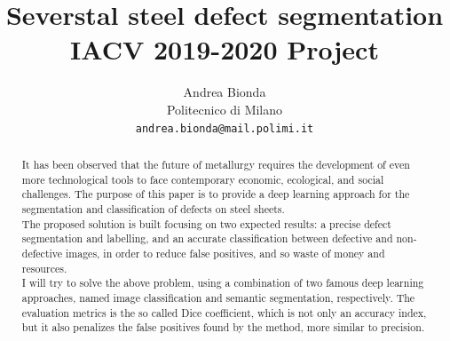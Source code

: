 \documentclass[10pt,twocolumn,letterpaper]{article}
\begin{document}
\title{Severstal steel defect segmentation \\ IACV 2019-2020 Project} 

\author{Andrea Bionda\\
Politecnico di Milano\\
{\tt\small andrea.bionda@mail.polimi.it}}

\maketitle

\begin{abstract}
   It has been observed that the future of metallurgy requires the development of even more technological tools to face contemporary economic, ecological, and social challenges.
   The purpose of this paper is to provide a deep learning approach for the segmentation and classification of defects on steel sheets.\\
   The proposed solution is built focusing on two expected results: a precise defect segmentation and labelling, and an accurate classification between defective and non-defective images, in order to reduce false positives, and so waste of money and resources.\\
   I will try to solve the above problem, using a combination of two famous deep learning approaches, named image classification and semantic segmentation, respectively.
   The evaluation metrics is the so called Dice coefficient, which is not only an accuracy index, but it also penalizes the false positives found by the method, more similar to precision.
\end{abstract}

\graphicspath{ {./Resources/} }
\end{document}
